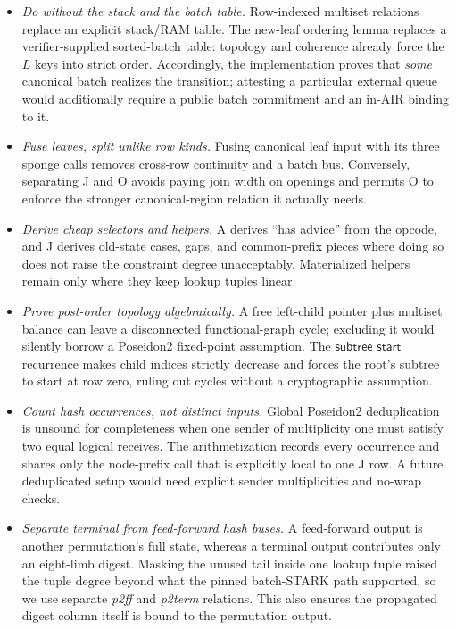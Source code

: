 \documentclass[twocolumn]{article}
\begin{document}
\begin{itemize}[nosep]
    \item \emph{Do without the stack and the batch table.} Row-indexed multiset relations replace an explicit stack/RAM table. The new-leaf ordering lemma replaces a verifier-supplied sorted-batch table: topology and coherence already force the $L$ keys into strict order. Accordingly, the implementation proves that \emph{some} canonical batch realizes the transition; attesting a particular external queue would additionally require a public batch commitment and an in-AIR binding to it.
    \item \emph{Fuse leaves, split unlike row kinds.} Fusing canonical leaf input with its three sponge calls removes cross-row continuity and a batch bus. Conversely, separating J and O avoids paying join width on openings and permits O to enforce the stronger canonical-region relation it actually needs.
    \item \emph{Derive cheap selectors and helpers.} A derives ``has advice'' from the opcode, and J derives old-state cases, gaps, and common-prefix pieces where doing so does not raise the constraint degree unacceptably. Materialized helpers remain only where they keep lookup tuples linear.
    \item \emph{Prove post-order topology algebraically.} A free left-child pointer plus multiset balance can leave a disconnected functional-graph cycle; excluding it would silently borrow a Poseidon2 fixed-point assumption. The $\mathsf{subtree\_start}$ recurrence makes child indices strictly decrease and forces the root's subtree to start at row zero, ruling out cycles without a cryptographic assumption.
    \item \emph{Count hash occurrences, not distinct inputs.} Global Poseidon2 deduplication is unsound for completeness when one sender of multiplicity one must satisfy two equal logical receives. The arithmetization records every occurrence and shares only the node-prefix call that is explicitly local to one J row. A future deduplicated setup would need explicit sender multiplicities and no-wrap checks.
    \item \emph{Separate terminal from feed-forward hash buses.} A feed-forward output is another permutation's full state, whereas a terminal output contributes only an eight-limb digest. Masking the unused tail inside one lookup tuple raised the tuple degree beyond what the pinned batch-STARK path supported, so we use separate \emph{p2ff} and \emph{p2term} relations. This also ensures the propagated digest column itself is bound to the permutation output.

\end{itemize}
\end{document}
